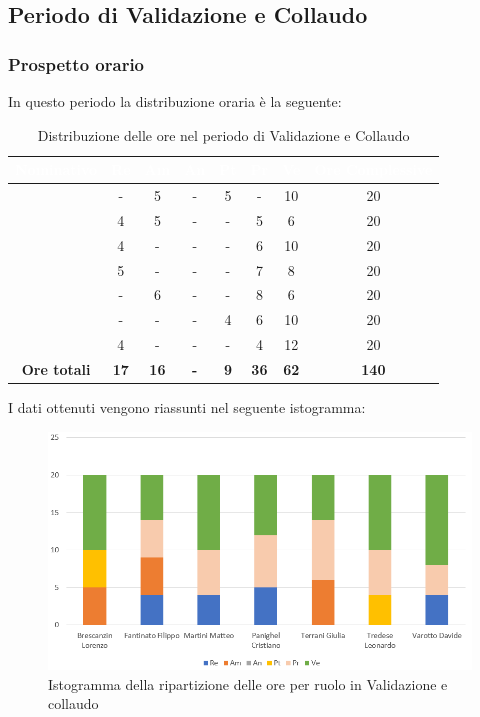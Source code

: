 \subsection{Periodo di Validazione e Collaudo}
\subsubsection{Prospetto orario}
In questo periodo la distribuzione oraria è la seguente:
\begin{table}[H]
	\begin{center}
		\begin{tabular}{ |c c c c c c c c| }
		\rowcolor{darkblue} 
		\textcolor{white}{\textbf{Nominativo}} & \textcolor{white}{\textbf{Re}} & \textcolor{white}{\textbf{Am}} & \textcolor{white}{\textbf{An}} & \textcolor{white}{\textbf{Pt}} & \textcolor{white}{\textbf{Pr}} & \textcolor{white}{\textbf{Ve}} & \textcolor{white}{\textbf{Ore Complessive}} \\ \hline
		\BL 	& -  	& 5  	& - 	& 5 	& - 	& 10 	& 20 \\ \hline
		\FF 	& 4  	& 5  	& - 	& - 	& 5 	& 6  	& 20 \\ \hline
		\MM 	& 4 	& - 	& - 	& - 	& 6 	& 10  	& 20 \\ \hline
		\PC 	& 5 	& -  	& - 	& - 	& 7 	& 8 	& 20 \\ \hline
		\TG 	& -  	& 6 	& - 	& - 	& 8 	& 6 	& 20 \\ \hline
		\TL 	& -  	& - 	& - 	& 4 	& 6 	& 10 	& 20 \\ \hline
		\VD 	& 4  	& -  	& - 	& - 	& 4 	& 12  	& 20 \\ \hline
		\textbf{Ore totali} & \textbf{17} & \textbf{16} & \textbf{-} & \textbf{9} & \textbf{36} & \textbf{62} & \textbf{140} \\ \hline
		\end{tabular}
	\caption{Distribuzione delle ore nel periodo di Validazione e Collaudo}
	\end{center}
\end{table}
I dati ottenuti vengono riassunti nel seguente istogramma:
\begin{figure}[H]
    \centering
    \includegraphics[scale = 0.70]{Immagini/ValidazioneIsto.png}
    \caption{Istogramma della ripartizione delle ore per ruolo in Validazione e collaudo}
    \label{fig:istogramma ripartizione ore, periodo di Validazione e Collaudo}
\end{figure}
\newpage
